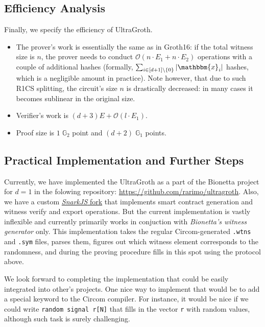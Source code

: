 \subsection{Efficiency Analysis}

Finally, we specify the efficiency of UltraGroth.
\begin{itemize}
    \item The prover's work is essentially the same as in Groth16: if the total witness size is $n$, the prover needs to conduct $\mathcal{O}(n \cdot E_1 + n \cdot E_2)$ operations with a couple of additional hashes (formally, $\sum_{i \in [d+1] \setminus \{0\}}|\mathbbm{x}_i|$ hashes, which is a negligible amount in practice). Note however, that due to such R1CS splitting, the circuit's size $n$ is drastically decreased: in many cases it becomes sublinear in the original size.
    \item Verifier's work is $(d+3)E+\mathcal{O}(l \cdot E_1)$.
    \item Proof size is $1\;\mathbb{G}_2$ point and $(d+2)\;\mathbb{G}_1$ points.
\end{itemize}

\subsection{Practical Implementation and Further Steps}

Currently, we have implemented the UltraGroth as a part of the Bionetta project
for $d=1$ in the folowing repository:
\url{https://github.com/rarimo/ultragroth}. Also, we have a custom
\href{https://github.com/rarimo/ultragroth-snarkjs}{\textit{SnarkJS} fork} that
implements smart contract generation and witness verify and export operations.
But the current implementation is vastly inflexible and currently primarily
works in conjuction with \textit{Bionetta's witness generator} only. This
implementation takes the regular Circom-generated \texttt{.wtns} and
\texttt{.sym} files, parses them, figures out which witness element corresponds
to the randomness, and during the proving procedure fills in this spot using the
protocol above. 

We look forward to completing the implementation that could be easily integrated
into other's projects. One nice way to implement that would be to add a special
keyword to the Circom compiler. For instance, it would be nice if we could write
\texttt{random signal r[N]} that fills in the vector \texttt{r} with random
values, although such task is surely challenging.

